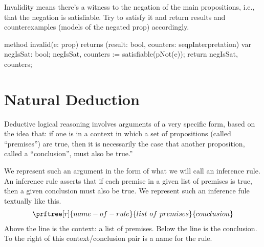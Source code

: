 \documentclass[letterpaper,10pt,english]{sphinxmanual}
\begin{document}
Invalidity means there’s a witness to the negation of the main
propositions, i.e., that the negation is satisfiable. Try to satisfy
it and return results and counterexamples (models of the negated prop)
accordingly.

\begin{sphinxVerbatim}[commandchars=\\\{\}]
   method invalid(e: prop) returns (result: bool,
                            counters: seq\PYGZlt{}pInterpretation\PYGZgt{})
   \PYGZob{}
       var negIsSat: bool;
       negIsSat, counters := satisfiable(pNot(e));
       return negIsSat, counters;
   \PYGZcb{}
\PYGZcb{}
\end{sphinxVerbatim}


\chapter{Natural Deduction}
\label{\detokenize{13-consequence:natural-deduction}}\label{\detokenize{13-consequence::doc}}
Deductive logical reasoning involves arguments of a very specific
form, based on the idea that: if one is in a context in which a set of
propositions (called “premises”) are true, then it is necessarily the
case that another proposition, called a “conclusion”, must also be
true.”

We represent such an argument in the form of what we will call an
inference rule. An inference rule asserts that if each premise in a
given list of premises is true, then a given conclusion must also be
true. We represent such an inference fule textually like this.
\begin{equation*}
\begin{split}\prftree[r]{name-of-rule}{list\ of\ premises}{conclusion}\end{split}
\end{equation*}
Above the line is the context: a list of premises. Below the line is
the conclusion. To the right of this context/conclusion pair is a name
for the rule.
\end{document}
